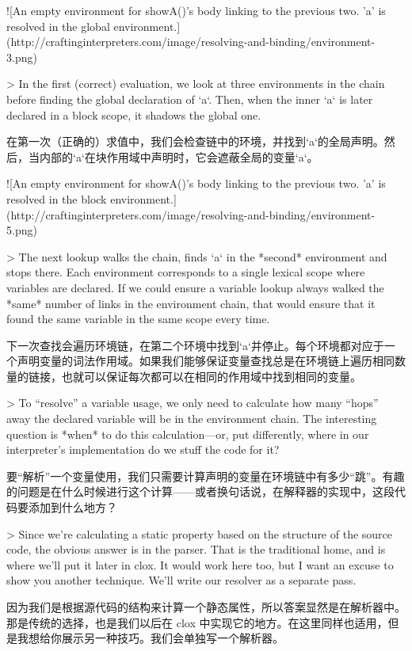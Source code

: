 \documentclass[cn,11pt,chinese]{elegantbook}
\begin{document}
{{{![An empty environment for showA()'s body linking to the previous two. 'a' is resolved in the global environment.](http://craftinginterpreters.com/image/resolving-and-binding/environment-3.png)

> In the first (correct) evaluation, we look at three environments in the chain before finding the global declaration of `a`. Then, when the inner `a` is later declared in a block scope, it shadows the global one.

在第一次（正确的）求值中，我们会检查链中的环境，并找到`a`的全局声明。然后，当内部的`a`在块作用域中声明时，它会遮蔽全局的变量`a`。

![An empty environment for showA()'s body linking to the previous two. 'a' is resolved in the block environment.](http://craftinginterpreters.com/image/resolving-and-binding/environment-5.png)

> The next lookup walks the chain, finds `a` in the *second* environment and stops there. Each environment corresponds to a single lexical scope where variables are declared. If we could ensure a variable lookup always walked the *same* number of links in the environment chain, that would ensure that it found the same variable in the same scope every time.

下一次查找会遍历环境链，在第二个环境中找到`a`并停止。每个环境都对应于一个声明变量的词法作用域。如果我们能够保证变量查找总是在环境链上遍历相同数量的链接，也就可以保证每次都可以在相同的作用域中找到相同的变量。

> To “resolve” a variable usage, we only need to calculate how many “hops” away the declared variable will be in the environment chain. The interesting question is *when* to do this calculation—or, put differently, where in our interpreter’s implementation do we stuff the code for it?

要“解析”一个变量使用，我们只需要计算声明的变量在环境链中有多少“跳”。有趣的问题是在什么时候进行这个计算——或者换句话说，在解释器的实现中，这段代码要添加到什么地方？

> Since we’re calculating a static property based on the structure of the source code, the obvious answer is in the parser. That is the traditional home, and is where we’ll put it later in clox. It would work here too, but I want an excuse to show you another technique. We’ll write our resolver as a separate pass.

因为我们是根据源代码的结构来计算一个静态属性，所以答案显然是在解析器中。那是传统的选择，也是我们以后在 clox 中实现它的地方。在这里同样也适用，但是我想给你展示另一种技巧。我们会单独写一个解析器。

}}}
\end{document}
